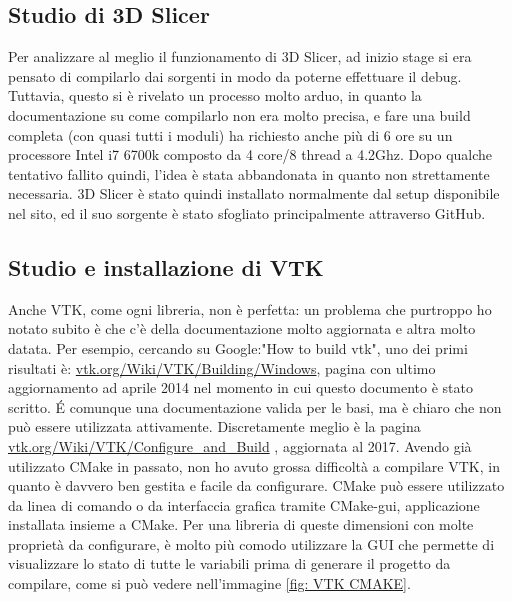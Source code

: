 \subsection{Studio di 3D Slicer}
Per analizzare al meglio il funzionamento di 3D Slicer, ad inizio stage si era pensato di compilarlo dai sorgenti in modo da poterne effettuare il debug. Tuttavia, questo si è rivelato un processo molto arduo, in quanto la documentazione su come compilarlo non era molto precisa, e fare una build completa (con quasi tutti i moduli) ha richiesto anche più di 6 ore su un processore Intel i7 6700k composto da 4 core/8 thread a 4.2Ghz. Dopo qualche tentativo fallito quindi, l'idea è stata abbandonata in quanto non strettamente necessaria. 3D Slicer è stato quindi installato normalmente dal setup disponibile nel sito, ed il suo sorgente è stato sfogliato principalmente attraverso GitHub.

\subsection{Studio e installazione di VTK}
Anche VTK, come ogni libreria, non è perfetta: un problema che purtroppo ho notato subito è che c'è della documentazione molto aggiornata e altra molto datata. Per esempio, cercando su Google:"How to build vtk", uno dei primi risultati è: \href{https://vtk.org/Wiki/VTK/Building/Windows}{vtk.org/Wiki/VTK/Building/Windows}, pagina con ultimo aggiornamento ad aprile 2014 nel momento in cui questo documento è stato scritto. \'E comunque una documentazione valida per le basi, ma è chiaro che non può essere utilizzata attivamente. Discretamente meglio è la pagina \href{https://vtk.org/Wiki/VTK/Configure_and_Build}{vtk.org/Wiki/VTK/Configure\_and\_Build} , aggiornata al 2017. Avendo già utilizzato CMake in passato, non ho avuto grossa difficoltà a compilare VTK, in quanto è davvero ben gestita e facile da configurare. CMake può essere utilizzato da linea di comando o da interfaccia grafica tramite CMake-gui, applicazione installata insieme a CMake. Per una libreria di queste dimensioni con molte proprietà da configurare, è molto più comodo utilizzare la GUI che permette di visualizzare lo stato di tutte le variabili prima di generare il progetto da compilare, come si può vedere nell'immagine \ref{fig: VTK CMAKE}.

